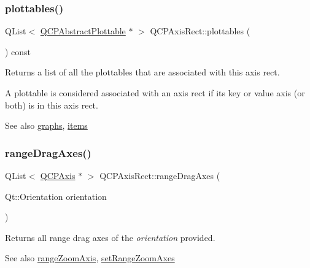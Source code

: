 \mbox{\label{class_q_c_p_axis_rect_a587d073a97b27bc7293fab4b2774ad59}} 
\subsubsection{\texorpdfstring{plottables()}{plottables()}}
{\footnotesize\ttfamily Q\+List$<$ \hyperlink{class_q_c_p_abstract_plottable}{Q\+C\+P\+Abstract\+Plottable} $\ast$ $>$ Q\+C\+P\+Axis\+Rect\+::plottables (\begin{DoxyParamCaption}{ }\end{DoxyParamCaption}) const}

Returns a list of all the plottables that are associated with this axis rect.

A plottable is considered associated with an axis rect if its key or value axis (or both) is in this axis rect.

\begin{DoxySeeAlso}{See also}
\hyperlink{class_q_c_p_axis_rect_a2d9ded3eca97be1fcb5867949391bb88}{graphs}, \hyperlink{class_q_c_p_axis_rect_a03c113a2175448300ee8f944e24776ba}{items} 
\end{DoxySeeAlso}
\mbox{\label{class_q_c_p_axis_rect_aae5f99a044ca911685a306f01b7ff941}} 
\subsubsection{\texorpdfstring{range\+Drag\+Axes()}{rangeDragAxes()}}
{\footnotesize\ttfamily Q\+List$<$ \hyperlink{class_q_c_p_axis}{Q\+C\+P\+Axis} $\ast$ $>$ Q\+C\+P\+Axis\+Rect\+::range\+Drag\+Axes (\begin{DoxyParamCaption}\item[{Qt\+::\+Orientation}]{orientation }\end{DoxyParamCaption})}

Returns all range drag axes of the {\itshape orientation} provided.

\begin{DoxySeeAlso}{See also}
\hyperlink{class_q_c_p_axis_rect_a679c63f2b8daccfe6ec5110dce3dd3b6}{range\+Zoom\+Axis}, \hyperlink{class_q_c_p_axis_rect_a9442cca2aa358405f39a64d51eca13d2}{set\+Range\+Zoom\+Axes} 
\end{DoxySeeAlso}
\mbox{\label{class_q_c_p_axis_rect_a6d7c22cfc54fac7a3d6ef80b133a8574}} 
